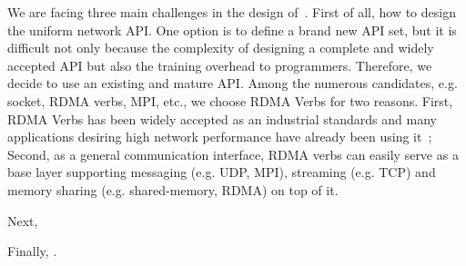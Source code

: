 We are facing three main challenges in the design of~\sysname. First of all, 
how to design the uniform network API. One option is to define a brand new API 
set, but it is difficult not only because the complexity of designing a complete
and widely accepted API but also the training overhead to programmers.
Therefore, we decide to use an existing and mature API. Among the numerous candidates, e.g. socket, RDMA verbs, MPI, etc., we choose RDMA Verbs for two
reasons. First, RDMA Verbs has been widely accepted as an industrial standards and many applications desiring high network performance have already been using it~\cite{?}; Second, as a general communication interface, RDMA verbs can easily serve as a base layer supporting messaging (e.g. UDP,
MPI), streaming (e.g. TCP) and memory sharing (e.g. shared-memory, RDMA) on top of it.

Next, 

Finally, .